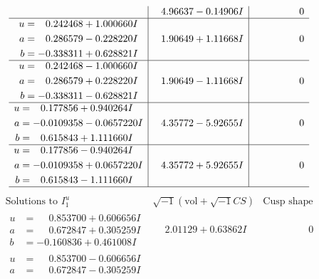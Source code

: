 \documentclass[1p]{elsarticle_modified}
\theoremstyle{definition}
\newcommand{\I}{\sqrt{-1}}
\begin{document}
$$\begin{array}{c|c|c}
 & \phantom{-}4.96637 - 0.14906 I & \phantom{-0.000000 } 0 \\ \hline\begin{aligned}
u &= \phantom{-}0.242468 + 1.000660 I \\
a &= \phantom{-}0.286579 - 0.228220 I \\
b &= -0.338311 + 0.628821 I\end{aligned}
 & \phantom{-}1.90649 + 1.11668 I & \phantom{-0.000000 } 0 \\ \hline\begin{aligned}
u &= \phantom{-}0.242468 - 1.000660 I \\
a &= \phantom{-}0.286579 + 0.228220 I \\
b &= -0.338311 - 0.628821 I\end{aligned}
 & \phantom{-}1.90649 - 1.11668 I & \phantom{-0.000000 } 0 \\ \hline\begin{aligned}
u &= \phantom{-}0.177856 + 0.940264 I \\
a &= -0.0109358 - 0.0657220 I \\
b &= \phantom{-}0.615843 + 1.111660 I\end{aligned}
 & \phantom{-}4.35772 - 5.92655 I & \phantom{-0.000000 } 0 \\ \hline\begin{aligned}
u &= \phantom{-}0.177856 - 0.940264 I \\
a &= -0.0109358 + 0.0657220 I \\
b &= \phantom{-}0.615843 - 1.111660 I\end{aligned}
 & \phantom{-}4.35772 + 5.92655 I & \phantom{-0.000000 } 0\\
 \hline 
 \end{array}$$\newpage$$\begin{array}{c|c|c}  
\text{Solutions to }I^u_{1}& \I (\text{vol} + \sqrt{-1}CS) & \text{Cusp shape}\\
 \hline 
\begin{aligned}
u &= \phantom{-}0.853700 + 0.606656 I \\
a &= \phantom{-}0.672847 + 0.305259 I \\
b &= -0.160836 + 0.461008 I\end{aligned}
 & \phantom{-}2.01129 + 0.63862 I & \phantom{-0.000000 } 0 \\ \hline\begin{aligned}
u &= \phantom{-}0.853700 - 0.606656 I \\
a &= \phantom{-}0.672847 - 0.305259 I \\

\end{aligned}
\end{array}$$
\end{document}

